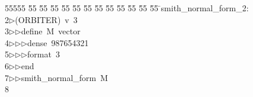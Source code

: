 %
%
\begin{tabbing}
55555 \= 55 \= 55 \= 55 \= 55 \= 55 \= 55 \= 55 \= 55 \= 55 \= 55 \= 55 \= 55 \= \>smith\_normal\_form\_2:\\[0pt]
2\>$\triangleright$\>(ORBITER)\ v\ 3\ \\[0pt]
3\>$\triangleright$\>$\triangleright$\>define\ M\ vector\ \\[0pt]
4\>$\triangleright$\>$\triangleright$\>$\triangleright$\>dense\ 987654321\ \\[0pt]
5\>$\triangleright$\>$\triangleright$\>$\triangleright$\>format\ 3\ \\[0pt]
6\>$\triangleright$\>$\triangleright$\>end\ \\[0pt]
7\>$\triangleright$\>$\triangleright$\>smith\_normal\_form\ M\\[0pt]
8\>\end{tabbing}
